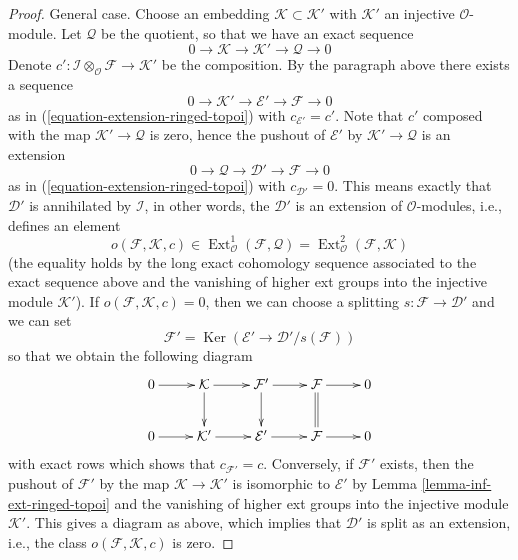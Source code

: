 \documentclass[10pt,a4paper]{amsart}
\theoremstyle{plain}
\theoremstyle{definition}
\theoremstyle{remark}
\numberwithin{equation}{subsection}
\def\Ext{\mathop{\mathrm{Ext}}\nolimits}
\def\Ker{\mathop{\mathrm{Ker}}}
\begin{document}
\begin{proof}
\medskip\noindent
General case. Choose an embedding $\mathcal{K} \subset \mathcal{K}'$
with $\mathcal{K}'$ an injective $\mathcal{O}$-module. Let $\mathcal{Q}$
be the quotient, so that we have an exact sequence
$$
0 \to \mathcal{K} \to \mathcal{K}' \to \mathcal{Q} \to 0
$$
Denote
$c' : \mathcal{I} \otimes_\mathcal{O} \mathcal{F} \to \mathcal{K}'$
be the composition. By the paragraph above there exists a sequence
$$
0 \to \mathcal{K}' \to \mathcal{E}' \to \mathcal{F} \to 0
$$
as in (\ref{equation-extension-ringed-topoi}) with $c_{\mathcal{E}'} = c'$.
Note that $c'$ composed with the map $\mathcal{K}' \to \mathcal{Q}$
is zero, hence the pushout of $\mathcal{E}'$ by
$\mathcal{K}' \to \mathcal{Q}$ is an extension
$$
0 \to \mathcal{Q} \to \mathcal{D}' \to \mathcal{F} \to 0
$$
as in (\ref{equation-extension-ringed-topoi}) with $c_{\mathcal{D}'} = 0$.
This means exactly that $\mathcal{D}'$ is annihilated by
$\mathcal{I}$, in other words, the $\mathcal{D}'$ is an extension
of $\mathcal{O}$-modules, i.e., defines an element
$$
o(\mathcal{F}, \mathcal{K}, c) \in
\Ext^1_\mathcal{O}(\mathcal{F}, \mathcal{Q}) =
\Ext^2_\mathcal{O}(\mathcal{F}, \mathcal{K})
$$
(the equality holds by the long exact cohomology sequence associated
to the exact sequence above and the vanishing of higher ext groups
into the injective module $\mathcal{K}'$). If
$o(\mathcal{F}, \mathcal{K}, c) = 0$, then we can choose a splitting
$s : \mathcal{F} \to \mathcal{D}'$ and we can set
$$
\mathcal{F}' = \Ker(\mathcal{E}' \to \mathcal{D}'/s(\mathcal{F}))
$$
so that we obtain the following diagram
$$
\xymatrix{
0 \ar[r] &
\mathcal{K} \ar[r] \ar[d] &
\mathcal{F}' \ar[r] \ar[d] &
\mathcal{F} \ar[r] \ar@{=}[d] &
0 \\
0 \ar[r] &
\mathcal{K}' \ar[r] &
\mathcal{E}' \ar[r] &
\mathcal{F} \ar[r] & 0
}
$$
with exact rows which shows that $c_{\mathcal{F}'} = c$. Conversely, if
$\mathcal{F}'$ exists, then the pushout of $\mathcal{F}'$ by the map
$\mathcal{K} \to \mathcal{K}'$ is isomorphic to $\mathcal{E}'$ by
Lemma \ref{lemma-inf-ext-ringed-topoi} and the vanishing of higher ext groups
into the injective module $\mathcal{K}'$. This gives a diagram
as above, which implies that $\mathcal{D}'$ is split as an extension, i.e.,
the class $o(\mathcal{F}, \mathcal{K}, c)$ is zero.
\end{proof}
\end{document}
